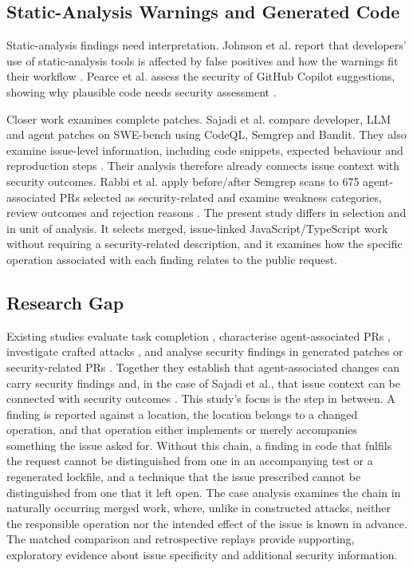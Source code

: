 \documentclass[acmsmall,screen,nonacm]{acmart}
\begin{document}
\subsection{Static-Analysis Warnings and Generated Code}

Static-analysis findings need interpretation. Johnson et al. report that developers' use of static-analysis tools is affected by false positives and how the warnings fit their workflow \cite{b33}. Pearce et al. assess the security of GitHub Copilot suggestions, showing why plausible code needs security assessment \cite{b35}.

Closer work examines complete patches. Sajadi et al. compare developer, LLM and agent patches on SWE-bench using CodeQL, Semgrep and Bandit. They also examine issue-level information, including code snippets, expected behaviour and reproduction steps \cite{b48}. Their analysis therefore already connects issue context with security outcomes. Rabbi et al. apply before/after Semgrep scans to 675 agent-associated PRs selected as security-related and examine weakness categories, review outcomes and rejection reasons \cite{b49}. The present study differs in selection and in unit of analysis. It selects merged, issue-linked JavaScript/\allowbreak TypeScript work without requiring a security-related description, and it examines how the specific operation associated with each finding relates to the public request.

\subsection{Research Gap}

Existing studies evaluate task completion \cite{b9,b22}, characterise agent-associated PRs \cite{b11,b21}, investigate crafted attacks \cite{b3,b16}, and analyse security findings in generated patches or security-related PRs \cite{b48,b49}. Together they establish that agent-associated changes can carry security findings and, in the case of Sajadi et al., that issue context can be connected with security outcomes \cite{b48}. This study's focus is the step in between. A finding is reported against a location, the location belongs to a changed operation, and that operation either implements or merely accompanies something the issue asked for. Without this chain, a finding in code that fulfils the request cannot be distinguished from one in an accompanying test or a regenerated lockfile, and a technique that the issue prescribed cannot be distinguished from one that it left open. The case analysis examines the chain in naturally occurring merged work, where, unlike in constructed attacks, neither the responsible operation nor the intended effect of the issue is known in advance. The matched comparison and retrospective replays provide supporting, exploratory evidence about issue specificity and additional security information.
\end{document}
